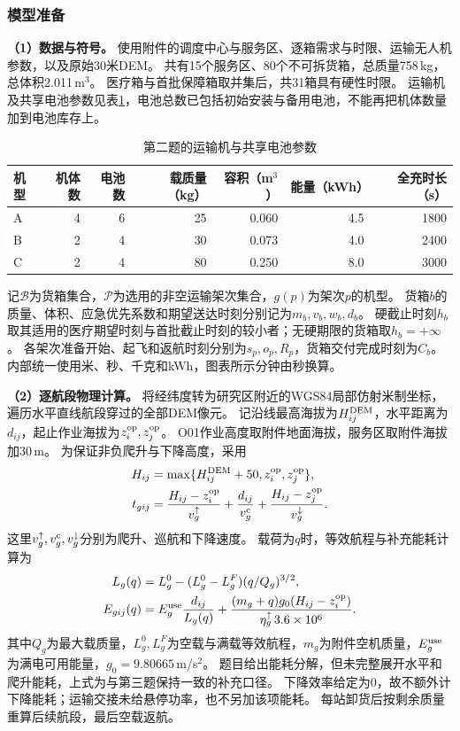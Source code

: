 \subsubsection{模型准备}
\label{sec:q2:preparation}

\textbf{（1）数据与符号。}
使用附件的调度中心与服务区、逐箱需求与时限、运输无人机参数，以及原始30米DEM。
共有15个服务区、80个不可拆货箱，总质量758\,kg，总体积2.011\,m$^3$。
医疗箱与首批保障箱取并集后，共31箱具有硬性时限。
运输机及共享电池参数见表\ref{tab:q2:inventory}，电池总数已包括初始安装与备用电池，不能再把机体数量加到电池库存上。

\begin{table}[htbp]
  \centering
  \caption{第二题的运输机与共享电池参数}
  \label{tab:q2:inventory}
  \begin{tabular}{lrrrrrr}
    \toprule
    机型 & 机体数 & 电池数 & 载质量（kg） & 容积（m$^3$） & 能量（kWh） & 全充时长（s） \\
    \midrule
    A & 4 & 6 & 25 & 0.060 & 4.5 & 1800 \\
    B & 2 & 4 & 30 & 0.073 & 4.0 & 2400 \\
    C & 2 & 4 & 80 & 0.250 & 8.0 & 3000 \\
    \bottomrule
  \end{tabular}
\end{table}

记$\mathcal B$为货箱集合，$\mathcal P$为选用的非空运输架次集合，$g(p)$为架次$p$的机型。
货箱$b$的质量、体积、应急优先系数和期望送达时刻分别记为$m_b,v_b,w_b,d_b$。
硬截止时刻$h_b$取其适用的医疗期望时刻与首批截止时刻的较小者；无硬期限的货箱取$h_b=+\infty$。
各架次准备开始、起飞和返航时刻分别为$s_p,o_p,R_p$，货箱交付完成时刻为$C_b$。
内部统一使用米、秒、千克和kWh，图表所示分钟由秒换算。

\textbf{（2）逐航段物理计算。}
将经纬度转为研究区附近的WGS84局部仿射米制坐标，遍历水平直线航段穿过的全部DEM像元。
记沿线最高海拔为$H^{\rm DEM}_{ij}$，水平距离为$d_{ij}$，起止作业海拔为$z_i^{\rm op},z_j^{\rm op}$。
O01作业高度取附件地面海拔，服务区取附件海拔加30\,m。
为保证非负爬升与下降高度，采用
\begin{align}
 H_{ij}&=\max\{H^{\rm DEM}_{ij}+50,z_i^{\rm op},z_j^{\rm op}\},\notag\\
 t_{gij}&=\frac{H_{ij}-z_i^{\rm op}}{v_g^{\uparrow}}
       +\frac{d_{ij}}{v_g^{\rm c}}
       +\frac{H_{ij}-z_j^{\rm op}}{v_g^{\downarrow}}.
 \label{eq:q2:flight}
\end{align}
这里$v_g^{\uparrow},v_g^{\rm c},v_g^{\downarrow}$分别为爬升、巡航和下降速度。
载荷为$q$时，等效航程与补充能耗计算为
\begin{align}
 L_g(q)&=L_g^0-(L_g^0-L_g^F)(q/Q_g)^{3/2},\notag\\
 E_{gij}(q)&=E_g^{\rm use}\frac{d_{ij}}{L_g(q)}
  +\frac{(m_g+q)g_0(H_{ij}-z_i^{\rm op})}{\eta_g^{\uparrow}\,3.6\times10^6}.
 \label{eq:q2:energy}
\end{align}
其中$Q_g$为最大载质量，$L_g^0,L_g^F$为空载与满载等效航程，$m_g$为附件空机质量，$E_g^{\rm use}$为满电可用能量，$g_0=9.80665$\,m/s$^2$。
题目给出能耗分解，但未完整展开水平和爬升能耗，上式为与第三题保持一致的补充口径。
下降效率给定为0，故不额外计下降能耗；运输交接未给悬停功率，也不另加该项能耗。
每站卸货后按剩余质量重算后续航段，最后空载返航。
